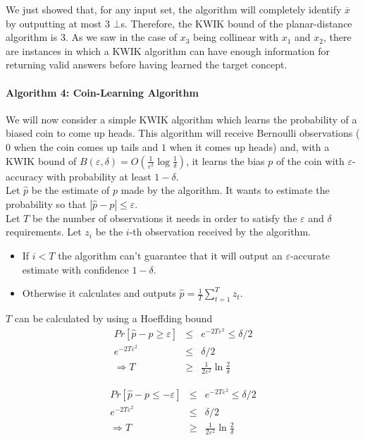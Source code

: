 We just showed that, for any input set, the algorithm will completely identify
$\overline{x}$ by outputting at most $3$ $\bot$s. Therefore, the KWIK bound of the
planar-distance algorithm is $3$. As we saw in the case of $x_3$ being collinear
with $x_1$ and $x_2$, there are instances in which a KWIK algorithm can
have enough information for returning valid answers before having learned the
target concept.

\paragraph{Algorithm 4: Coin-Learning Algorithm}
We will now consider a simple KWIK algorithm which learns the probability of a
biased coin to come up heads. This algorithm will receive Bernoulli observations
($0$ when the coin comes up tails and $1$ when it comes up heads) and, with a
KWIK bound of $B(\varepsilon, \delta) = O(\frac{1}{\varepsilon^2}\log \frac{1}{\delta})$, it learns the
bias $p$ of the coin with $\varepsilon$-accuracy with probability at least $1-\delta$. \\

Let $\hat{p}$ be the estimate of $p$ made by the algorithm. It wants to estimate
the probability so that $|\hat{p} - p| \leq \varepsilon$. \\


Let $T$ be the number of observations it needs in order to satisfy the $\varepsilon$ and $\delta$ requirements.
Let $z_i$ be the $i$-th observation received by the algorithm.

\begin{itemize}
  \item If $i < T$ the algorithm can't guarantee that it will
  output an $\varepsilon$-accurate estimate with confidence $1-\delta$.
  \item Otherwise it calculates and outputs $\hat{p} = \frac{1}{T}\sum_{t=1}^{T}z_t$.
\end{itemize}
$T$ can be calculated by using a Hoeffding bound
\begin{eqnarray*}
  Pr[\hat{p} - p \geq \varepsilon] &\leq&  e^{-2T\varepsilon^2} \leq \delta/2 \\
  e^{-2T\varepsilon^2} &\leq& \delta/2 \\
  \Rightarrow T &\geq& \frac{1}{2\varepsilon^2}\ln \frac{2}{\delta}
\end{eqnarray*}

\begin{eqnarray*}
  Pr[\hat{p} - p \leq -\varepsilon] &\leq&  e^{-2T\varepsilon^2} \leq \delta/2 \\
  e^{-2T\varepsilon^2} &\leq& \delta/2 \\
  \Rightarrow T &\geq& \frac{1}{2\varepsilon^2}\ln \frac{2}{\delta}
\end{eqnarray*}

